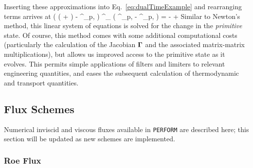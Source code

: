 Inserting these approximations into Eq.~\ref{eq:dualTimeExample} and rearranging terms arrives at
\be
    \left( \left(  +  \right) \identMat -  \jacobMat^\timeIdx_{p,} \right) \gm^\timeIdx_{} \left( \consVec^\timeIdx_{p,\newtonIdx} - \consVec^\timeIdx_{p,} \right) = -   + 
\ee
Similar to Newton's method, this linear system of equations is solved for the change in the \textit{primitive} state. Of course, this method comes with some additional computational costs (particularly the calculation of the Jacobian $\boldsymbol{\Gamma}$ and the associated matrix-matrix multiplications), but allows us improved access to the primitive state as it evolves. This permits simple applications of filters and limiters to relevant engineering quantities, and eases the subsequent calculation of thermodynamic and transport quantities.

\newpage
\subsection{Flux Schemes}\label{sec:fluxSchemes}

Numerical inviscid and viscous fluxes available in \verb|PERFORM| are described here; this section will be updated as new schemes are implemented.

\subsubsection{Roe Flux}

